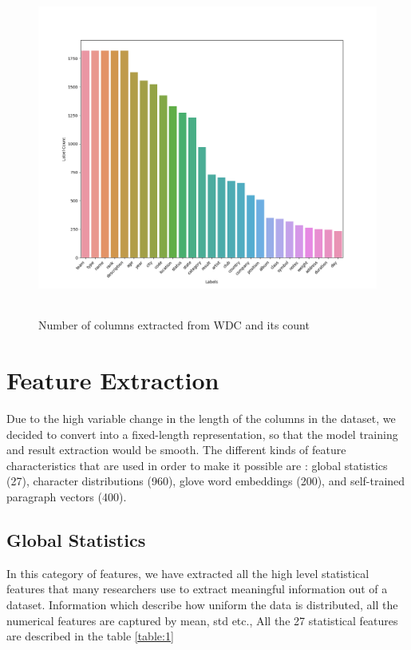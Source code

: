 \documentclass[12pt, a4paper]{report}
\theoremstyle{definition}
\numberwithin{equation}{chapter}
\numberwithin{figure}{chapter}
\numberwithin{table}{chapter}
\begin{document}
\begin{spacing}{1.5}
\begin{figure}[H]
    \centering
    \includegraphics[width=\textwidth, height=11cm]{./Pics/label_count_100000.png} 
    \caption{Number of columns extracted from WDC and its count}
    \label{fig:columns}
\end{figure}

\section{Feature Extraction}
\label{sec:feature}

Due to the high variable change in the length of the columns in the dataset, we decided to convert into a fixed-length representation, so that the model training and result extraction would be smooth. The different kinds of feature characteristics \cite{sherlock} that are used in order to make it possible are : global statistics (27), character distributions (960), glove word embeddings (200), and self-trained paragraph vectors (400).

\subsection{Global Statistics}
\label{ssec:stat}

In this category of features, we have extracted all the high level statistical features that many researchers use to extract meaningful information out of a dataset. Information which describe how uniform the data is distributed, all the numerical features are captured by mean, std etc., All the 27 statistical features are described in the table \ref{table:1}


\end{spacing}
\end{document}
